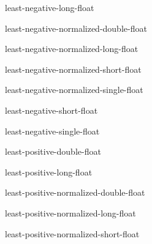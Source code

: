 \begin{constant}{least-negative-long-float}{}{}{}
  
\end{constant}

\begin{constant}{least-negative-normalized-double-float}{}{}{}
  
\end{constant}

\begin{constant}{least-negative-normalized-long-float}{}{}{}
  
\end{constant}

\begin{constant}{least-negative-normalized-short-float}{}{}{}
  
\end{constant}

\begin{constant}{least-negative-normalized-single-float}{}{}{}
  
\end{constant}

\begin{constant}{least-negative-short-float}{}{}{}
  
\end{constant}

\begin{constant}{least-negative-single-float}{}{}{}
  
\end{constant}

\begin{constant}{least-positive-double-float}{}{}{}
  
\end{constant}

\begin{constant}{least-positive-long-float}{}{}{}
  
\end{constant}

\begin{constant}{least-positive-normalized-double-float}{}{}{}
  
\end{constant}

\begin{constant}{least-positive-normalized-long-float}{}{}{}
  
\end{constant}

\begin{constant}{least-positive-normalized-short-float}{}{}{}
  
\end{constant}


